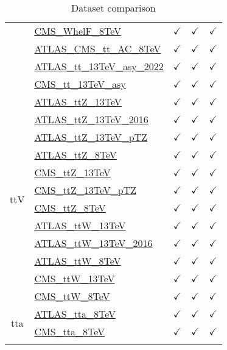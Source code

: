 \documentclass{article}
\begin{document}
\begin{longtable}{|c|l|c|c|c|}
 & \href{https://arxiv.org}{CMS_WhelF_8TeV}  & $\checkmark$ & $\checkmark$ & $\checkmark$\\ \cline{2-5}
 & \href{https://arxiv.org}{ATLAS_CMS_tt_AC_8TeV}  & $\checkmark$ & $\checkmark$ & $\checkmark$\\ \cline{2-5}
 & \href{https://arxiv.org}{ATLAS_tt_13TeV_asy_2022}  & $\checkmark$ & $\checkmark$ & $\checkmark$\\ \cline{2-5}
 & \href{https://arxiv.org}{CMS_tt_13TeV_asy}  & $\checkmark$ & $\checkmark$ & $\checkmark$
\\ \hline
\multirow{12}{*}{ttV}
 & \href{https://arxiv.org}{ATLAS_ttZ_13TeV}  & $\checkmark$ & $\checkmark$ & $\checkmark$\\ \cline{2-5}
 & \href{https://arxiv.org}{ATLAS_ttZ_13TeV_2016}  & $\checkmark$ & $\checkmark$ & $\checkmark$\\ \cline{2-5}
 & \href{https://arxiv.org}{ATLAS_ttZ_13TeV_pTZ}  & $\checkmark$ & $\checkmark$ & $\checkmark$\\ \cline{2-5}
 & \href{https://arxiv.org}{ATLAS_ttZ_8TeV}  & $\checkmark$ & $\checkmark$ & $\checkmark$\\ \cline{2-5}
 & \href{https://arxiv.org}{CMS_ttZ_13TeV}  & $\checkmark$ & $\checkmark$ & $\checkmark$\\ \cline{2-5}
 & \href{https://arxiv.org}{CMS_ttZ_13TeV_pTZ}  & $\checkmark$ & $\checkmark$ & $\checkmark$\\ \cline{2-5}
 & \href{https://arxiv.org}{CMS_ttZ_8TeV}  & $\checkmark$ & $\checkmark$ & $\checkmark$\\ \cline{2-5}
 & \href{https://arxiv.org}{ATLAS_ttW_13TeV}  & $\checkmark$ & $\checkmark$ & $\checkmark$\\ \cline{2-5}
 & \href{https://arxiv.org}{ATLAS_ttW_13TeV_2016}  & $\checkmark$ & $\checkmark$ & $\checkmark$\\ \cline{2-5}
 & \href{https://arxiv.org}{ATLAS_ttW_8TeV}  & $\checkmark$ & $\checkmark$ & $\checkmark$\\ \cline{2-5}
 & \href{https://arxiv.org}{CMS_ttW_13TeV}  & $\checkmark$ & $\checkmark$ & $\checkmark$\\ \cline{2-5}
 & \href{https://arxiv.org}{CMS_ttW_8TeV}  & $\checkmark$ & $\checkmark$ & $\checkmark$
\\ \hline
\multirow{2}{*}{tta}
 & \href{https://arxiv.org}{ATLAS_tta_8TeV}  & $\checkmark$ & $\checkmark$ & $\checkmark$\\ \cline{2-5}
 & \href{https://arxiv.org}{CMS_tta_8TeV}  & $\checkmark$ & $\checkmark$ & $\checkmark$
\\ \hline
\caption{Dataset comparison}
\end{longtable}
\end{document}
